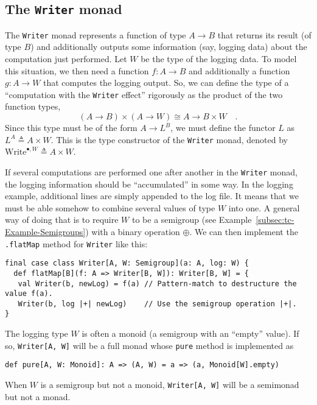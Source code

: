 \subsection{The \texttt{Writer} monad}

The \lstinline!Writer!
monad represents a function of type $A\rightarrow B$ that returns
its result (of type $B$) and additionally outputs some information
(say, logging data) about the computation just performed. Let $W$
be the type of the logging data. To model this situation, we then
need a function $f:A\rightarrow B$ and additionally a function $g:A\rightarrow W$
that computes the logging output. So, we can define the type of a
\textsf{``}computation with the \lstinline!Writer! effect\textsf{''} rigorously as
the product of the two function types,
\[
\left(A\rightarrow B\right)\times\left(A\rightarrow W\right)\cong A\rightarrow B\times W\quad.
\]
Since this type must be of the form $A\rightarrow L^{B}$, we must
define the functor $L$ as $L^{A}\triangleq A\times W$. This is the
type constructor of the \lstinline!Writer! monad, denoted by $\text{Write}^{\bullet,W}\triangleq A\times W$.

If several computations are performed one after another in the \lstinline!Writer!
monad, the logging information should be \textsf{``}accumulated\textsf{''} in some
way. In the logging example, additional lines are simply appended
to the log file. It means that we must be able somehow to combine
several values of type $W$ into one. A general way of doing that
is to require $W$ to be a semigroup (see Example~\ref{subsec:tc-Example-Semigroups})
with a binary operation $\oplus$. We can then implement the \lstinline!.flatMap!
method for \lstinline!Writer! like this:
\begin{lstlisting}
final case class Writer[A, W: Semigroup](a: A, log: W) {
  def flatMap[B](f: A => Writer[B, W]): Writer[B, W] = {
   val Writer(b, newLog) = f(a) // Pattern-match to destructure the value f(a).
   Writer(b, log |+| newLog)    // Use the semigroup operation |+|.
}
\end{lstlisting}
\begin{comment}
\[
\text{flm}_{\text{Write}}(f^{:A\rightarrow B\times W})\triangleq a\times w\rightarrow\left(\pi_{1}f(a)\right)\times\left(w\oplus\pi_{2}f(a)\right)\quad.
\]
\end{comment}

The logging type $W$ is often a monoid (a semigroup with an \textsf{``}empty\textsf{''}
value). If so, \lstinline!Writer[A, W]! will be a full monad whose
\lstinline!pure! method is implemented as
\begin{lstlisting}
def pure[A, W: Monoid]: A => (A, W) = a => (a, Monoid[W].empty)
\end{lstlisting}
When $W$ is a semigroup but not a monoid, \lstinline!Writer[A, W]!
will be a semimonad but not a monad. 

